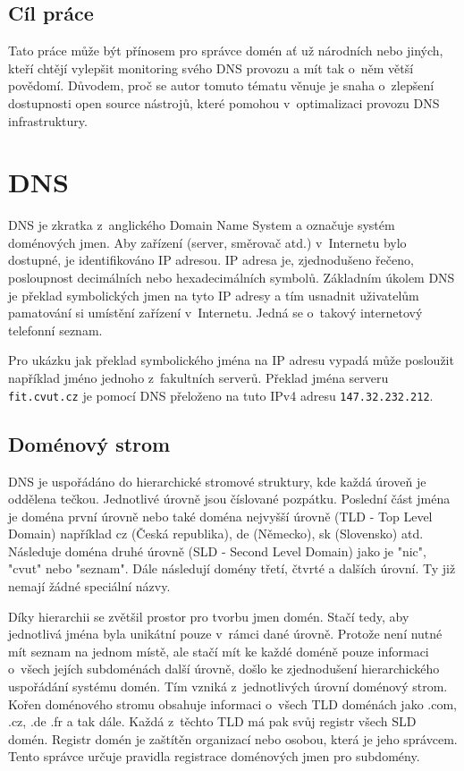 \documentclass[thesis=M,czech]{src/FITthesis}[2019/12/23]
\begin{document}
\begin{introduction}
\section{Cíl práce}
Tato práce může být přínosem pro správce domén ať už národních nebo jiných, kteří chtějí vylepšit monitoring svého DNS provozu a mít tak o~něm větší povědomí. Důvodem, proč se autor tomuto tématu věnuje je snaha o~zlepšení dostupnosti open source nástrojů, které pomohou v~optimalizaci provozu DNS infrastruktury.
\end{introduction}
\chapter{DNS}
DNS je zkratka z~anglického Domain Name System a označuje systém \linebreak doménových jmen. Aby zařízení (server, směrovač atd.) v~Internetu bylo dostupné, je identifikováno IP adresou. IP adresa je, zjednodušeno řečeno, posloupnost decimálních nebo hexadecimálních symbolů. Základním úkolem DNS je překlad symbolických jmen na tyto IP adresy a tím usnadnit uživatelům pamatování si umístění zařízení v~Internetu. Jedná se o~takový internetový telefonní seznam. \cite{cznic-dns, RFC1034, RFC1035}

Pro ukázku jak překlad symbolického jména na IP adresu vypadá může posloužit například jméno jednoho z~fakultních serverů. Překlad jména serveru \texttt{fit.cvut.cz} je pomocí DNS přeloženo na tuto IPv4 adresu \texttt{147.32.232.212}.

\section{Doménový strom}
DNS je uspořádáno do hierarchické stromové struktury, kde každá úroveň je oddělena tečkou. Jednotlivé úrovně jsou číslované pozpátku. Poslední část jména je doména první úrovně nebo také doména nejvyšší úrovně (TLD - Top Level Domain) například cz (Česká republika), de (Německo), sk (Slovensko) atd. Následuje doména druhé úrovně (SLD - Second Level Domain) jako je "nic", "cvut" nebo "seznam". Dále následují domény třetí, čtvrté a dalších úrovní. Ty již nemají žádné speciální názvy. 

Díky hierarchii se zvětšil prostor pro tvorbu jmen domén. Stačí tedy, aby jednotlivá jména byla unikátní pouze v~rámci dané úrovně. Protože není nutné mít seznam na jednom místě, ale stačí mít ke každé doméně pouze informaci o~všech jejích subdoménách další úrovně, došlo ke zjednodušení hierarchického uspořádání systému domén. Tím vzniká z~jednotlivých úrovní doménový strom. Kořen doménového stromu obsahuje informaci o~všech TLD doménách jako .com, .cz, .de .fr a tak dále. Každá z~těchto TLD má pak svůj registr všech SLD domén. Registr domén je zaštítěn organizací nebo osobou, která je jeho správcem. Tento správce určuje pravidla registrace doménových jmen pro subdomény.
\end{document}
